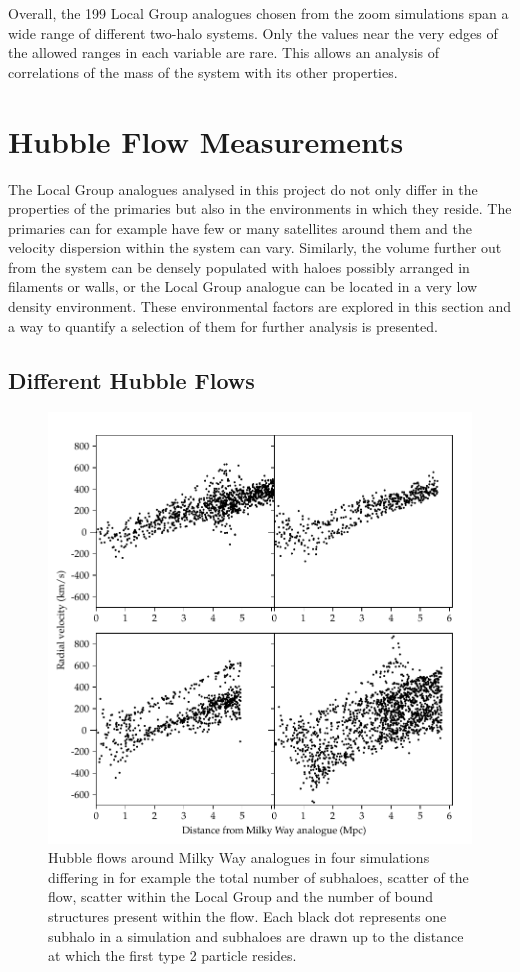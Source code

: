 \documentclass[english, oneside]{HYgradu}
\begin{document}
Overall, the 199 Local Group analogues chosen from the zoom simulations span a wide range of different two-halo systems. Only the values near the very edges of the allowed ranges in each variable are rare. This allows an analysis of correlations of the mass of the system with its other properties.


\section{Hubble Flow Measurements}
The Local Group analogues analysed in this project do not only differ in the properties of the primaries but also in the environments in which they reside. The primaries can for example have few or many satellites around them and the velocity dispersion within the system can vary. Similarly, the volume further out from the system can be densely populated with haloes possibly arranged in filaments or walls, or the Local Group analogue can be located in a very low density environment. These environmental factors are explored in this section and a way to quantify a selection of them for further analysis is presented.

\subsection{Different Hubble Flows}

\begin{figure}
    \centering
    \includegraphics{kuvat/hubblediagrams.pdf}
    \caption{Hubble flows around Milky Way analogues in four simulations differing in for example the total number of subhaloes, scatter of the flow, scatter within the Local Group and the number of bound structures present within the flow. Each black dot represents one subhalo in a simulation and subhaloes are drawn up to the distance at which the first type 2 particle resides.}\label{fig:hubblediagrams}
\end{figure}
\end{document}
